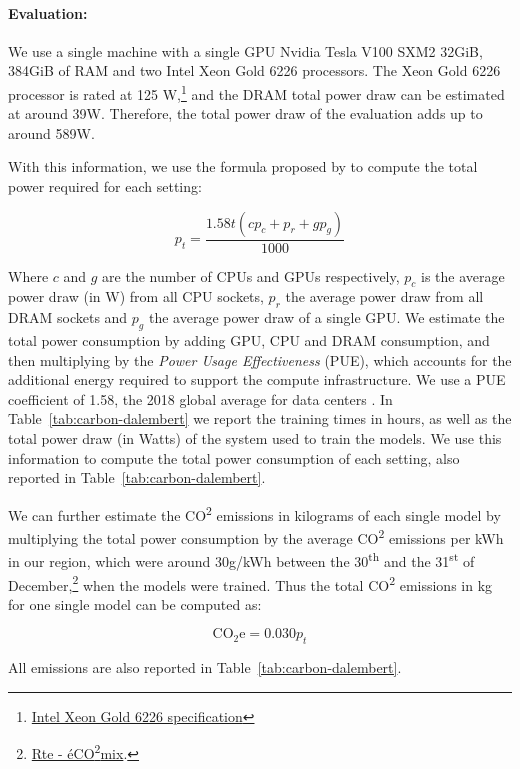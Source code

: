 \paragraph{Evaluation:} We use a single machine with a single GPU Nvidia Tesla V100 SXM2 32GiB, 384GiB of RAM and two Intel Xeon Gold 6226 processors. The Xeon Gold 6226 processor is rated at 125 W,\footnote{\href{https://ark.intel.com/content/www/us/en/ark/products/193957/intel-xeon-gold-6226-processor-19-25m-cache-2-70-ghz.html}{Intel Xeon Gold 6226 specification}} and the DRAM total power draw can be estimated at around 39W. Therefore, the total power draw of the evaluation adds up to around 589W.

With this information, we use the formula proposed by  to compute the total power required for each setting:

\begin{equation*}
    p_t = \frac{1.58t(cp_{c} + p_r + gp_g)}{1000}
\end{equation*}

Where $c$ and $g$ are the number of CPUs and GPUs respectively, $p_c$ is the average power draw (in W) from all CPU sockets, $p_r$ the average power draw from all DRAM sockets and $p_g$ the average power draw of a single GPU. We estimate the total power consumption by adding GPU, CPU and DRAM consumption, and then multiplying by the \emph{Power Usage Effectiveness} (PUE), which accounts for the additional energy required to support the compute infrastructure. We use a PUE coefficient of 1.58, the 2018 global average for data centers \cite{strubell-etal-2019-energy}. In Table~\ref{tab:carbon-dalembert} we report the training times in hours, as well as the total power draw (in Watts) of the system used to train the models. We use this information to compute the total power consumption of each setting, also reported in Table~\ref{tab:carbon-dalembert}.

We can further estimate the CO\textsuperscript{2} emissions in kilograms of each single model by multiplying the total power consumption by the average CO\textsuperscript{2} emissions per kWh in our region, which were around 30g/kWh between the 30\textsuperscript{th} and the 31\textsuperscript{st} of December,\footnote{\href{https://www.rte-france.com/eco2mix/les-emissions-de-co2-par-kwh-produit-en-france}{Rte - éCO\textsuperscript{2}mix}.} when the models were trained. Thus the total CO\textsuperscript{2} emissions in kg for one single model can be computed as:

\begin{equation*}
    \text{CO}_{2}\text{e} = 0.030 p_t
\end{equation*}

All emissions are also reported in Table~\ref{tab:carbon-dalembert}.

